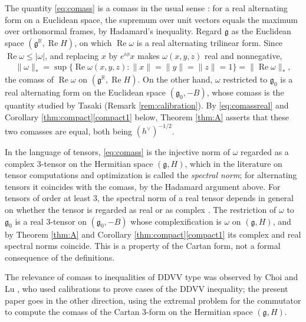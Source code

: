 \documentclass [leqno, 10pt]{amsart}
\theoremstyle{definition}
\numberwithin{equation}{section}
\newcommand{\om}{\omega}
\newcommand{\re}{\operatorname{Re}}
\newcommand{\g}{\mathfrak{g}}
\newcommand{\rea}{\mathbb R}
\newcommand{\gz}{\g_{0}}
\newcommand{\hv}{h^\vee}
\newcommand{\norm}[1]{\lVert #1\rVert}
\newcommand{\comass}[1]{\lVert #1\rVert_{\ast}}%
\begin{document}
\begin{remark}\label{rem:comass}
The quantity \eqref{eq:comass} is a comass in the usual sense \cite{Harvey-Lawson}: for a real alternating form on a Euclidean space, the supremum over unit vectors equals the maximum over orthonormal frames, by Hadamard's inequality. Regard $\g$ as the Euclidean space $(\g^{\rea}, \re H)$, on which $\re\om$ is a real alternating trilinear form. Since $\re\om \leq |\om|$, and replacing $x$ by $e^{i\phi}x$ makes $\om(x, y, z)$ real and nonnegative,
\begin{align}\label{eq:comassreal}
\comass{\om} = \sup\big\{\re\om(x, y, z): \norm{x} = \norm{y} = \norm{z} = 1\big\} = \comass{\re\om},
\end{align}
the comass of $\re\om$ on $(\g^{\rea}, \re H)$. On the other hand, $\om$ restricted to $\gz$ is a real alternating form on the Euclidean space $(\gz, -B)$, whose comass is the quantity studied by Tasaki \cite{Tasaki-calibration} (Remark \ref{rem:calibration}). By \eqref{eq:comassreal} and Corollary \ref{thm:compact}\ref{compact1} below, Theorem \ref{thm:A} asserts that these two comasses are equal, both being $(\hv)^{-1/2}$.

In the language of tensors, \eqref{eq:comass} is the injective norm of $\om$ regarded as a complex $3$-tensor on the Hermitian space $(\g, H)$, which in the literature on tensor computations and optimization is called the \emph{spectral norm}; for alternating tensors it coincides with the comass, by the Hadamard argument above. For tensors of order at least $3$, the spectral norm of a real tensor depends in general on whether the tensor is regarded as real or as complex \cite{Friedland-Lim-nuclear}. The restriction of $\om$ to $\gz$ is a real $3$-tensor on $(\gz, -B)$ whose complexification is $\om$ on $(\g, H)$, and by Theorem \ref{thm:A} and Corollary \ref{thm:compact}\ref{compact1} its complex and real spectral norms coincide. This is a property of the Cartan form, not a formal consequence of the definitions.

The relevance of comass to inequalities of DDVV type was observed by Choi and Lu \cite{Choi-Lu}, who used calibrations to prove cases of the DDVV inequality; the present paper goes in the other direction, using the extremal problem for the commutator to compute the comass of the Cartan $3$-form on the Hermitian space $(\g, H)$.
\end{remark}
\end{document}

